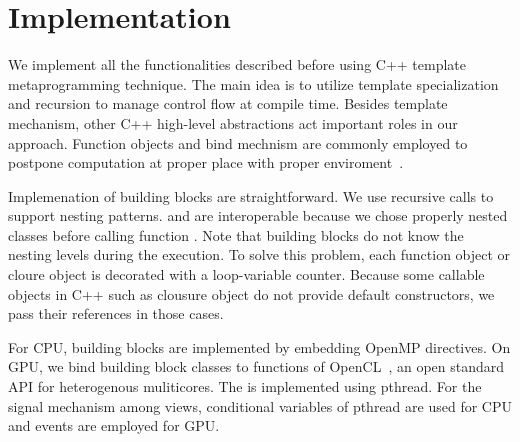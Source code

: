 \section{Implementation}
\label{sec:details}

We implement all the functionalities described before using C++
template metaprogramming technique.
The main idea is to utilize
template specialization and recursion to manage control flow at
compile time. Besides template mechanism, other C++ high-level
abstractions act important roles in our approach.
Function objects and bind mechnism are commonly employed to postpone computation
at proper place with proper enviroment~\cite{moderncpp}.

Implemenation of building blocks are straightforward. We use recursive calls
to support nesting patterns.  and  are interoperable
because we chose properly nested classes before calling function . Note that
building blocks do not know the nesting levels during the execution. To solve this
problem, each function object or cloure object is decorated with a loop-variable
counter.
Because some callable objects in C++ such as clousure object
do not provide default constructors, we pass their
references in those cases. 

For CPU, building blocks are implemented by embedding OpenMP directives. On GPU, we bind
building block classes to functions of OpenCL~\cite{opencl}, an open standard API
for heterogenous muliticores. The  is implemented using pthread.
For the signal mechanism among views, conditional variables of pthread are used
for CPU and events are employed for GPU.

